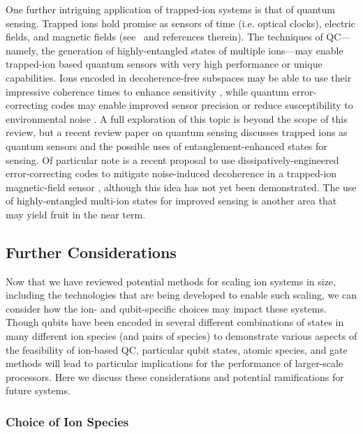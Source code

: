 \documentclass[%
reprint,
 amsmath,amssymb,
]{revtex4-1}
\begin{document}
One further intriguing application of trapped-ion systems is that of quantum sensing. Trapped ions hold promise as sensors of time (i.e. optical clocks), electric fields, and magnetic fields (see~\cite{DegenQuantumSensingRMP2017} and references therein). The techniques of QC---namely, the generation of highly-entangled states of multiple ions---may enable trapped-ion based quantum sensors with very high performance or unique capabilities. Ions encoded in decoherence-free subspaces may be able to use their impressive coherence times to enhance sensitivity \cite{SchmidtKalerEntangledSensor2012}, while quantum error-correcting codes may enable improved sensor precision or reduce susceptibility to environmental noise \cite{OzeriHeisenberg2013, DurImprovedmetrology2014}. A full exploration of this topic is beyond the scope of this review, but a recent review paper on quantum sensing \cite{DegenQuantumSensingRMP2017} discusses trapped ions as quantum sensors and the possible uses of entanglement-enhanced states for sensing. Of particular note is a recent proposal to use dissipatively-engineered error-correcting codes to mitigate noise-induced decoherence in a trapped-ion magnetic-field sensor \cite{ReiterDissipativeSensing2017}, although this idea has not yet been demonstrated. The use of highly-entangled multi-ion states for improved sensing is another area that may yield fruit in the near term.

\subsection{Further Considerations}

Now that we have reviewed potential methods for scaling ion systems in size, including the technologies that are being developed to enable such scaling, we can consider how the ion- and qubit-specific choices may impact these systems.  Though qubits have been encoded in several different combinations of states in many different ion species (and pairs of species) to demonstrate various aspects of the feasibility of ion-based QC, particular qubit states, atomic species, and gate methods will lead to particular implications for the performance of larger-scale processors.  Here we discuss these considerations and potential ramifications for future systems.

  \subsubsection{Choice of Ion Species}
\end{document}
